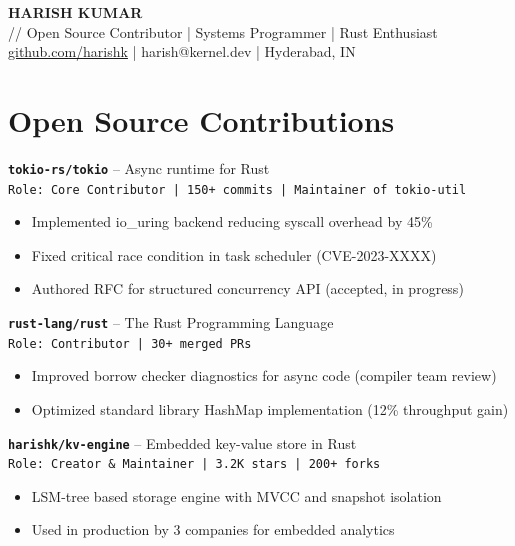 \documentclass[10pt,letterpaper]{article}
\begin{document}
\begin{tcolorbox}[colframe=ghgreen,colback=ghbg]
\begin{center}
{\Large\bfseries\ttfamily HARISH KUMAR}\\[2pt]
{\small\ttfamily // Open Source Contributor | Systems Programmer | Rust Enthusiast}\\[4pt]
{\footnotesize\ttfamily {} \href{https://github.com/harishk}{github.com/harishk} |  harish@kernel.dev |  Hyderabad, IN}
\end{center}
\end{tcolorbox}

\section{Open Source Contributions}

\begin{tcolorbox}
\texttt{\textbf{\color{ghgreen}tokio-rs/tokio}} -- Async runtime for Rust\\
\texttt{Role: Core Contributor | 150+ commits | Maintainer of tokio-util}
\end{tcolorbox}
\begin{itemize}
\item Implemented io\_uring backend reducing syscall overhead by 45\%
\item Fixed critical race condition in task scheduler (CVE-2023-XXXX)
\item Authored RFC for structured concurrency API (accepted, in progress)
\end{itemize}

\begin{tcolorbox}
\texttt{\textbf{\color{ghgreen}rust-lang/rust}} -- The Rust Programming Language\\
\texttt{Role: Contributor | 30+ merged PRs}
\end{tcolorbox}
\begin{itemize}
\item Improved borrow checker diagnostics for async code (compiler team review)
\item Optimized standard library HashMap implementation (12\% throughput gain)
\end{itemize}

\begin{tcolorbox}
\texttt{\textbf{\color{ghgreen}harishk/kv-engine}} -- Embedded key-value store in Rust\\
\texttt{Role: Creator \& Maintainer | 3.2K stars | 200+ forks}
\end{tcolorbox}
\begin{itemize}
\item LSM-tree based storage engine with MVCC and snapshot isolation
\item Used in production by 3 companies for embedded analytics
\end{itemize}
\end{document}
